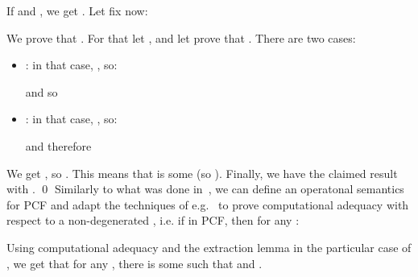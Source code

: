\documentclass{CSML}
\begin{document}
If  and , we get . Let fix now:

We prove that . For that let , and let prove that . There are two cases:
\begin{itemize}
\item: in that case, , so:

and  so 
\item: in that case, , so:

and therefore 
\end{itemize}
We get , so . This means that  is some  (so ). Finally, we have the claimed result with .
\qed
Similarly to what was done in~\cite{BlotRibaBarRec}, we can define an operatonal semantics for PCF and adapt the techniques of e.g.~\cite{AmadioCurien} to prove computational adequacy with respect to a non-degenerated , i.e. if  in PCF, then for any :

Using computational adequacy and the extraction lemma in the particular case of , we get that for any , there is some  such that  and .
\end{document}
